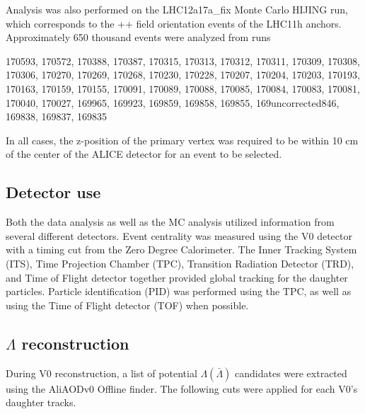 Analysis was also performed on the LHC12a17a\_fix Monte Carlo HIJING run, which corresponds to the ++ field orientation events of the LHC11h anchors.  Approximately 650 thousand events were analyzed from runs

170593, 170572, 170388, 170387, 170315, 170313, 170312, 170311, 170309, 170308, 170306, 170270, 170269, 170268, 170230, 170228, 170207, 170204, 170203, 170193, 170163, 170159, 170155, 170091, 170089, 170088, 170085, 170084, 170083, 170081, 170040, 170027, 169965, 169923, 169859, 169858, 169855, 169uncorrected846, 169838, 169837, 169835

In all cases, the z-position of the primary vertex was required to be within 10 cm of the center of the ALICE detector for an event to be selected.  

\subsection{Detector use}
Both the data analysis as well as the MC analysis utilized information from several different detectors.  Event centrality was measured using the V0 detector with a timing cut from the Zero Degree Calorimeter.  The Inner Tracking System (ITS), Time Projection Chamber (TPC), Transition Radiation Detector (TRD), and Time of Flight detector together provided global tracking for the daughter particles.  Particle identification (PID) was performed using the TPC, as well as using the Time of Flight detector (TOF) when possible.

\subsection{$\Lambda$ reconstruction}
\label{sec:Recon}

During V0 reconstruction, a list of potential $\Lambda(\bar{\Lambda})$ candidates were extracted using the AliAODv0 Offline finder. The following cuts were applied for each V0's daughter tracks.

